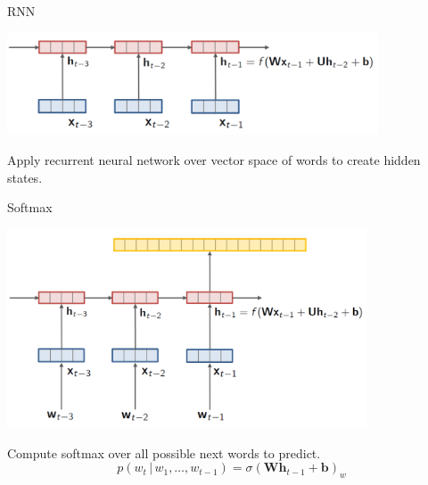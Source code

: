 \documentclass{beamer}
\let\tempone\itemize
\let\temptwo\enditemize
\renewenvironment{itemize}{\tempone\addtolength{\itemsep}{0.5\baselineskip}}{\temptwo}
\newcommand{\given}{\,|\,}
\begin{document}

\begin{frame}{RNN}
  \begin{center}
    \includegraphics[width=11cm]{rnn}
  \end{center}  
  \begin{itemize}
  \item Apply recurrent neural network over vector space of words to create hidden states.
  \end{itemize}
\end{frame}




\begin{frame}{Softmax}
  \begin{center}

    \includegraphics[width=0.8\textwidth]{rnnlm5}
  \end{center}
    
  \begin{itemize}
  \item Compute softmax over all possible next words to predict.
  \end{itemize}
  \[  p(w_t \given w_1, \ldots, w_{t-1}) = \sigma(\mathbf{W} \mathbf{h}_{t-1} + \mathbf{b})_w \] 

\end{frame}
\end{document}
